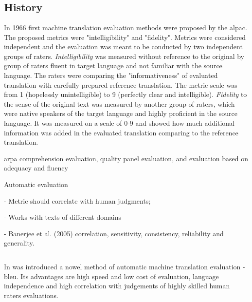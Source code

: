 \section{}

\subsection{History}

In 1966 first machine translation evaluation methods were proposed
by the \acrfull{alpac}.
The proposed metrics were "intelligibility" and "fidelity"\citep[p~67]{Translation1966}.
Metrics were considered independent and the evaluation was meant to be conducted
by two independent groups of raters.
\textit{Intelligibility} was measured without reference to the original by
group of raters fluent in target language and not familiar with the source language.
The raters were comparing the "informativeness" of evaluated translation with carefully
prepared reference translation. The metric scale was from 1 (hopelessly unintelligible)
to 9 (perfectly clear and intelligible).
\textit{Fidelity} to the sense of the original text was measured by another group of raters,
which were native speakers of the target language and highly proficient in the source language.
It was measured on a scale of 0-9 and showed how much additional information was added in
the evaluated translation comparing to the reference translation.

\acrfull{arpa}
comprehension evaluation, quality panel evaluation, and evaluation based on adequacy and fluency

Automatic evaluation

- Metric should correlate with human judgments;

- Works with texts of different domains

- Banerjee et al. (2005) correlation, sensitivity, consistency, reliability and generality.

\subsection{}

In \cite{Papineni02bleu} was introduced a nowel method of automatic machine
translation evaluation - \acrfull{bleu}.
Its advantages are high speed and low cost of evaluation,
language independence and high correlation with judgements
of highly skilled human raters evaluations.

